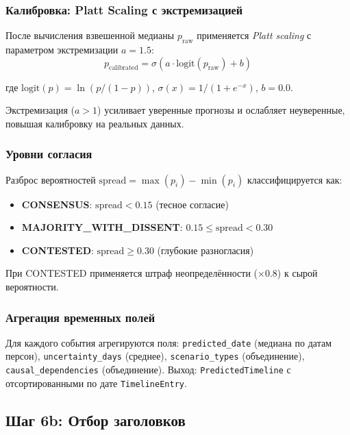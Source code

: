 \subsubsection{Калибровка: Platt Scaling с экстремизацией}

После вычисления взвешенной медианы $p_{\text{raw}}$ применяется \emph{Platt scaling} с параметром экстремизации $a = 1.5$:
\begin{equation}
p_{\text{calibrated}} = \sigma(a \cdot \text{logit}(p_{\text{raw}}) + b)
\label{eq:platt}
\end{equation}

где $\text{logit}(p) = \ln(p/(1-p))$, $\sigma(x) = 1/(1+e^{-x})$, $b = 0.0$.

Экстремизация ($a > 1$) усиливает уверенные прогнозы и ослабляет неуверенные, повышая калибровку на реальных данных.

\subsubsection{Уровни согласия}

Разброс вероятностей $\text{spread} = \max(p_i) - \min(p_i)$ классифицируется как:
\begin{itemize}
  \item \textbf{CONSENSUS}: $\text{spread} < 0.15$ (тесное согласие)
  \item \textbf{MAJORITY\_WITH\_DISSENT}: $0.15 \leq \text{spread} < 0.30$
  \item \textbf{CONTESTED}: $\text{spread} \geq 0.30$ (глубокие разногласия)
\end{itemize}

При CONTESTED применяется штраф неопределённости ($\times 0.8$) к сырой вероятности.

\subsubsection{Агрегация временных полей}

Для каждого события агрегируются поля: \verb|predicted_date| (медиана по датам персон), \verb|uncertainty_days| (среднее), \verb|scenario_types| (объединение), \verb|causal_dependencies| (объединение). Выход: \verb|PredictedTimeline| с отсортированными по дате \verb|TimelineEntry|.

\subsection{Шаг 6b: Отбор заголовков}

